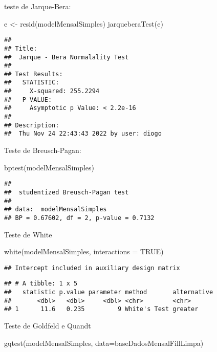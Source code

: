 \documentclass[
]{article}
\newenvironment{Shaded}{\begin{snugshade}}{\end{snugshade}}
\newcommand{\AttributeTok}[1]{\textcolor[rgb]{0.77,0.63,0.00}{#1}}
\newcommand{\ConstantTok}[1]{\textcolor[rgb]{0.00,0.00,0.00}{#1}}
\newcommand{\FunctionTok}[1]{\textcolor[rgb]{0.00,0.00,0.00}{#1}}
\newcommand{\NormalTok}[1]{#1}
\newcommand{\OtherTok}[1]{\textcolor[rgb]{0.56,0.35,0.01}{#1}}
\begin{document}
teste de Jarque-Bera:

\begin{Shaded}
\begin{Highlighting}[]
\NormalTok{e }\OtherTok{\textless{}{-}} \FunctionTok{resid}\NormalTok{(modelMensalSimples)}
\FunctionTok{jarqueberaTest}\NormalTok{(e)}
\end{Highlighting}
\end{Shaded}

\begin{verbatim}
## 
## Title:
##  Jarque - Bera Normalality Test
## 
## Test Results:
##   STATISTIC:
##     X-squared: 255.2294
##   P VALUE:
##     Asymptotic p Value: < 2.2e-16 
## 
## Description:
##  Thu Nov 24 22:43:43 2022 by user: diogo
\end{verbatim}

Teste de Breusch-Pagan:

\begin{Shaded}
\begin{Highlighting}[]
\FunctionTok{bptest}\NormalTok{(modelMensalSimples)}
\end{Highlighting}
\end{Shaded}

\begin{verbatim}
## 
##  studentized Breusch-Pagan test
## 
## data:  modelMensalSimples
## BP = 0.67602, df = 2, p-value = 0.7132
\end{verbatim}

Teste de White

\begin{Shaded}
\begin{Highlighting}[]
\FunctionTok{white}\NormalTok{(modelMensalSimples, }\AttributeTok{interactions =} \ConstantTok{TRUE}\NormalTok{)}
\end{Highlighting}
\end{Shaded}

\begin{verbatim}
## Intercept included in auxiliary design matrix
\end{verbatim}

\begin{verbatim}
## # A tibble: 1 x 5
##   statistic p.value parameter method       alternative
##       <dbl>   <dbl>     <dbl> <chr>        <chr>      
## 1      11.6   0.235         9 White's Test greater
\end{verbatim}

Teste de Goldfeld e Quandt

\begin{Shaded}
\begin{Highlighting}[]
\FunctionTok{gqtest}\NormalTok{(modelMensalSimples, }\AttributeTok{data=}\NormalTok{baseDadosMensalFillLimpa)}
\end{Highlighting}
\end{Shaded}
\end{document}
